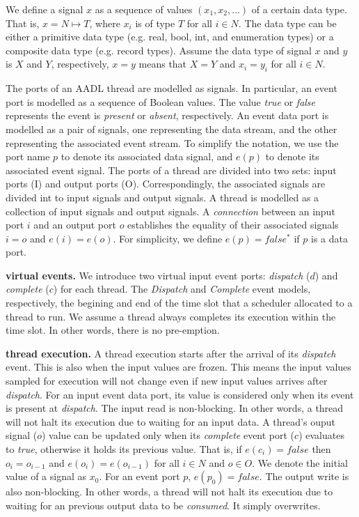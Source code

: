 
We define a signal $x$ as a sequence of values $(x_1, x_2, ...)$ of a certain data type. That is, $x = N \mapsto T$, where $x_i$ is of type $T$ for all $i \in N$. The data type can be either a primitive data type (e.g. real, bool, int, and enumeration types) or a composite data type (e.g. record types). Assume the data type of signal $x$ and $y$ is $X$ and $Y$, respectively, $x = y$ means that $X=Y$ and $x_i = y_i$ for all $i \in N$. 

The ports of an AADL thread are modelled as signals. In particular, an event port is modelled as a sequence of Boolean values. The value \emph{true} or \emph{false} represents the event is \emph{present} or \emph{absent}, respectively. An event data port is modelled as a pair of signals, one representing the data stream, and the other representing the associated event stream. To simplify the notation, we use the port name $p$ to denote its associated data signal, and $e(p)$ to denote its associated event signal. The ports of a thread are divided into two sets: input ports (I) and output ports (O). Correspondingly, the associated signals are divided int to input signals and output signals. A thread is modelled as a collection of input signals and output signals.
A \emph{connection} between an input port $i$ and an output port $o$ establishes the equality of their associated signals $i = o$ and $e(i) = e(o)$. For simplicity, we define $e(p) = false^*$ if $p$ is a data port.

{\bf virtual events.}
We introduce two virtual input event ports: \emph{dispatch} ($d$) and \emph{complete} ($c$) for each thread.  The \emph{Dispatch} and \emph{Complete} event models, respectively, the begining and end of the time slot that a scheduler allocated to a thread to run. We assume a thread always completes its execution within the time slot. In other words, there is no pre-emption. 

{\bf thread execution.}
A thread execution starts after the arrival of its \emph{dispatch} event. This is also when the input values are frozen. This means the input values sampled for execution will not change even if new input values arrives after \emph{dispatch}. For an input event data port, its value is considered only when its event is present at \emph{dispatch}. The input read is non-blocking. In other words, a thread will not halt its execution due to waiting for an input data.
A thread's ouput signal ($o$) value can be updated only when its \emph{complete} event port ($c$) evaluates to \emph{true}, otherwise it holds its previous value. That is, if $e(c_i)=false$ then $o_i = o_{i-1}$  and $e(o_i) = e(o_{i-1})$ for all $i \in N$ and $o \in O$. We denote the initial value of a signal as $x_0$. For an event port $p$, $e(p_0) = false$. The output write is also non-blocking. In other words, a thread will not halt its execution due to waiting for an previous output data to be \emph{consumed}. It simply overwrites.


